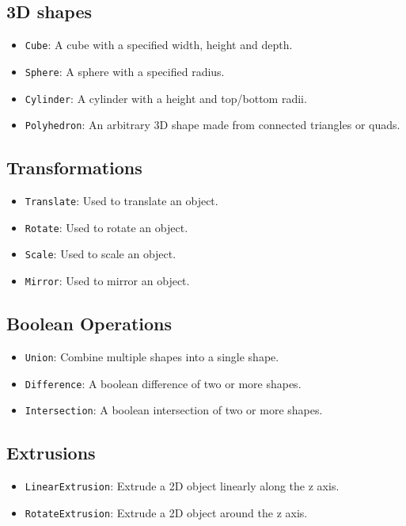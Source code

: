 \subsection{3D shapes}

\begin{itemize}
	\item \texttt{Cube}: A cube with a specified width, height and depth.
	\item \texttt{Sphere}: A sphere with a specified radius.
	\item \texttt{Cylinder}: A cylinder with a height and top/bottom radii.
	\item \texttt{Polyhedron}: An arbitrary 3D shape made from connected triangles
		or quads.
\end{itemize}

\subsection{Transformations}

\begin{itemize}
	\item \texttt{Translate}: Used to translate an object.
	\item \texttt{Rotate}: Used to rotate an object.
	\item \texttt{Scale}: Used to scale an object.
	\item \texttt{Mirror}: Used to mirror an object.
\end{itemize}

\subsection{Boolean Operations}

\begin{itemize}
	\item \texttt{Union}: Combine multiple shapes into a single shape.
	\item \texttt{Difference}: A boolean difference of two or more shapes.
	\item \texttt{Intersection}: A boolean intersection of two or more shapes.
\end{itemize}

\subsection{Extrusions}

\begin{itemize}
	\item \texttt{LinearExtrusion}: Extrude a 2D object linearly along the z axis.
	\item \texttt{RotateExtrusion}: Extrude a 2D object around the z axis. 
\end{itemize}

